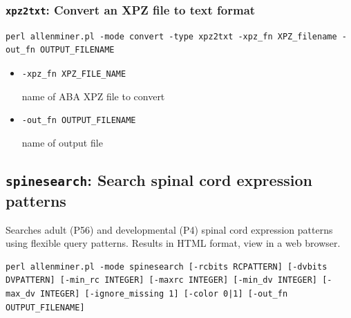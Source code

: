 \documentclass[10pt]{article}
\begin{document}
\subsubsection*{{\tt xpz2txt}: Convert an XPZ file to text format}
\begin{lstlisting}
perl allenminer.pl -mode convert -type xpz2txt -xpz_fn XPZ_filename -out_fn OUTPUT_FILENAME 
\end{lstlisting}

\begin{itemize}
\item {\tt -xpz\_fn XPZ\_FILE\_NAME}

name of ABA XPZ file to convert

\item {\tt -out\_fn OUTPUT\_FILENAME}

name of output file
\end{itemize}



%
%
%
%


\subsection{{\tt spinesearch}: Search spinal cord expression patterns}

Searches adult (P56) and developmental (P4) spinal cord expression patterns using flexible query patterns. Results in HTML format, view in a web browser.

\begin{lstlisting}
perl allenminer.pl -mode spinesearch [-rcbits RCPATTERN] [-dvbits DVPATTERN] [-min_rc INTEGER] [-maxrc INTEGER] [-min_dv INTEGER] [-max_dv INTEGER] [-ignore_missing 1] [-color 0|1] [-out_fn OUTPUT_FILENAME]
\end{lstlisting}
\end{document}
